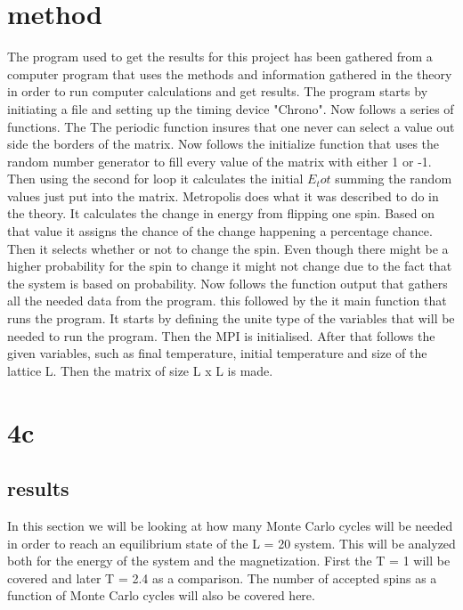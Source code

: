 \documentclass{article}
\begin{document}
\section{method}
\newline
\newline
The program used to get the results for this project has been gathered from a computer program that uses the methods and information gathered in the theory in order to run computer calculations and get results. The program starts by initiating a file and setting up the timing device "Chrono". Now follows a series of functions. The
\newline
\newline
The periodic function insures that one never can select a value out side the borders of the matrix. Now follows the initialize function that uses the random number generator to fill every value of the matrix with either 1 or -1. Then using the second for loop it calculates the initial $E_tot$ summing the random values just put into the matrix.
\newline
\newline
Metropolis does what it was described to do in the theory. It calculates the change in energy from flipping one spin. Based on that value it assigns the chance of the change happening a percentage chance. Then it selects whether or not to change the spin. Even though there might be a higher probability for the spin to change it might not change due to the fact that the system is based on probability.
\newline
\newline
Now follows the function output that gathers all the needed data from the program.
\newline
\newline
this followed by the it main function that runs the program. It starts by defining the unite type of the variables that will be needed to run the program. Then the MPI is initialised. After that follows the given variables, such as final temperature, initial temperature and size of the lattice L. Then the matrix of size L x L is made.
\newline
\newline

\section{4c}
\subsection{results}
In this section we will be looking at how many Monte Carlo cycles will be needed in order to reach an equilibrium state of the L = 20 system. This will be analyzed both for the energy of the system and the magnetization. First the T = 1 will be covered and later T = 2.4 as a comparison. The number of accepted spins as a function of Monte Carlo cycles will also be covered here.
\end{document}
